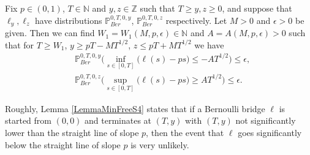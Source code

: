 \begin{lemma}\label{LemmaMinFreeS4} Fix $p \in (0,1)$, $T \in \mathbb{N}$ and $y,z\in \mathbb{Z}$ such that $T \geq y,z \geq 0$, and suppose that $\ell_y,\ell_z$ have distributions $\mathbb{P}^{0,T,0,y}_{Ber}$, $\mathbb{P}^{0,T,0,z}_{Ber}$ respectively. Let $M > 0$ and $\epsilon > 0$ be given. Then we can find $W_1=W_1(M,p, \epsilon) \in \mathbb{N}$ and $A=A(M,p, \epsilon) > 0$ such that for $T \geq W_1$, $ y \geq p T -  MT^{1/2}$, $z \leq pT + MT^{1/2}$ we have
\begin{equation}\label{minFree1S4}
\begin{split}
&\mathbb{P}^{0,T,0,y}_{Ber}\Big( \inf_{s \in [ 0, T]}\big( \ell(s) -  ps \big) \leq -AT^{1/2} \Big) \leq \epsilon, \\ &\mathbb{P}^{0,T,0,z}_{Ber}\Big( \sup_{s \in [ 0, T]}\big( \ell(s) -  ps \big) \geq AT^{1/2} \Big) \leq \epsilon.
\end{split}
\end{equation}
\end{lemma}
\begin{remark} Roughly, Lemma \ref{LemmaMinFreeS4} states that if a Bernoulli bridge $\ell$ is started from $(0,0)$ and terminates at $(T,y)$ with $(T,y)$ not significantly lower than the straight line of slope $p$, then the event that $\ell$ goes significantly below the straight line of slope $p$ is very unlikely.
\end{remark}

